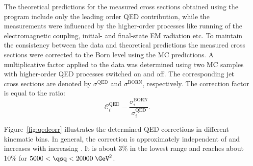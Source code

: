 The theoretical predictions for the measured cross sections obtained using the \nlojet program include only the leading order QED contribution, while the measurements were influenced by the higher-order processes like running of the electromagnetic coupling, initial- and final-state EM radiation etc. To maintain the consistency between the data and theoretical predictions the measured cross sections were corrected to the Born level using the MC predictions. A multiplicative factor applied to the data was determined using two \lepto MC samples with higher-order QED processes switched on and off. The corresponding jet cross sections are denoted by $\sigma^\text{QED}$ and $\sigma^\text{BORN}$, respectively. The correction factor is equal to the ratio:
\begin{equation}
 \mathcal{C}^\text{QED}_i = \frac{\sigma_i^\text{BORN}}{\sigma_i^\text{QED}}.
 \label{eq:eqdcorr}
\end{equation}

Figure~\ref{fig:qedcorr} illustrates the determined QED corrections in different kinematic bins. In general, the correction is approximately independent of \etjetb and increases with increasing \qsq. It is about 3\% in the lowest \qsq range and reaches about 10\% for $5000 < \qsq < 20000\;\GeV^2$.
 


